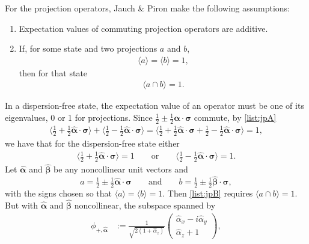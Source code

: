 \documentclass[12pt]{article}
\begin{document}
For the projection operators, Jauch \& Piron make the following assumptions:
\begin{enumerate}[label=(\Alph*)]
  \item\label{list:jpA} Expectation values of commuting projection operators are additive.
  \item\label{list:jpB} If, for some state and two projections $a$ and $b$,
  \begin{align*}
    \langle a \rangle = \langle b \rangle = 1,
  \end{align*}
  then for that state 
  \begin{align*}
    \langle a \cap b \rangle = 1.
  \end{align*}
\end{enumerate}
In a dispersion-free state, the expectation value of an operator must be one of its eigenvalues, 0 or 1 for projections. Since $\tfrac{1}{2}\pm\tfrac{1}{2}\bm{\alpha}\cdot\bm{\sigma}$ commute, by \ref{list:jpA}
\begin{align*}
  \langle \tfrac{1}{2} + \tfrac{1}{2} \hat{\bm{\alpha}} \cdot \bm{\sigma} \rangle +
  \langle \tfrac{1}{2} - \tfrac{1}{2} \hat{\bm{\alpha}} \cdot \bm{\sigma} \rangle
  = \langle \tfrac{1}{2} + \tfrac{1}{2} \hat{\bm{\alpha}} \cdot \bm{\sigma} + \tfrac{1}{2} - \tfrac{1}{2} \hat{\bm{\alpha}} \cdot \bm{\sigma} \rangle
  = 1,
\end{align*}
we have that for the dispersion-free state either
\begin{align*}
  \langle \tfrac{1}{2} + \tfrac{1}{2} \hat{\bm{\alpha}} \cdot \bm{\sigma} \rangle = 1
  \qquad \text{or} \qquad
  \langle \tfrac{1}{2} - \tfrac{1}{2} \hat{\bm{\alpha}} \cdot \bm{\sigma} \rangle = 1.
\end{align*}
Let $\hat{\bm{\alpha}}$ and $\hat{\bm{\beta}}$ be any noncollinear unit vectors and
\begin{displaymath}
  a = \tfrac{1}{2} \pm \tfrac{1}{2} \hat{\bm{\alpha}} \cdot \bm{\sigma}
  \qquad \text{and} \qquad
  b = \tfrac{1}{2} \pm \tfrac{1}{2} \hat{\bm{\beta}} \cdot \bm{\sigma},
\end{displaymath}
with the signs chosen so that $\langle a \rangle = \langle b \rangle = 1$. Then \ref{list:jpB} requires $\langle a \cap b \rangle = 1$.  But with $\hat{\bm{\alpha}}$ and $\hat{\bm{\beta}}$ noncollinear, the subspace spanned by 
\begin{align*}
    \phi_{+,\hat{\bm{\alpha}}}
    &:= \frac{1}{\sqrt{2 (1 + \hat{\alpha}_z)}}
  \begin{pmatrix}
    \hat{\alpha}_x - i \hat{\alpha}_y \\
    \hat{\alpha}_z + 1
  \end{pmatrix},
\end{align*}
\end{document}
